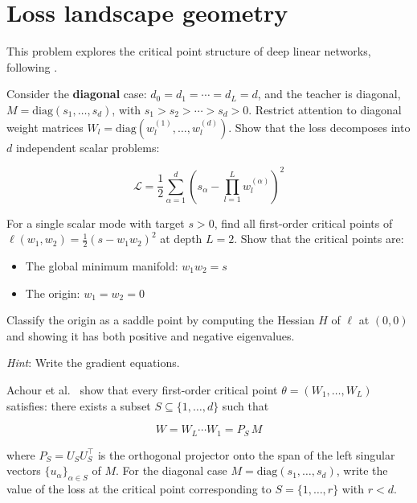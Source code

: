 \documentclass[11pt]{article}
\providecommand{\tightlist}{%
  \setlength{\itemsep}{0pt}\setlength{\parskip}{0pt}}
\begin{document}
\section{Loss landscape geometry}
\label{sec:td-geometry}

This problem explores the critical point structure of deep linear
networks, following \cite{achour2024}.

\begin{exercise}
\label{ex:td-1a}
Consider the \textbf{diagonal} case:
\(d_0 = d_1 = \cdots = d_L = d\), and the teacher is diagonal,
\(M = \text{diag}(s_1, \ldots, s_d)\), with
\(s_1 > s_2 > \cdots > s_d > 0\). Restrict attention to diagonal weight
matrices \(W_l = \text{diag}(w_l^{(1)}, \ldots, w_l^{(d)})\). Show that
the loss decomposes into \(d\) independent scalar problems:

\[\mathcal{L} = \frac{1}{2}\sum_{\alpha=1}^d \left(s_\alpha - \prod_{l=1}^L w_l^{(\alpha)}\right)^2\]
\end{exercise}


\begin{exercise}
\label{ex:td-1b}
For a single scalar mode with target \(s > 0\), find all
first-order critical points of
\(\ell(w_1, w_2) = \frac{1}{2}(s - w_1 w_2)^2\) at depth \(L = 2\). Show
that the critical points are:

\begin{itemize}
\tightlist
\item
  The global minimum manifold: \(w_1 w_2 = s\)
\item
  The origin: \(w_1 = w_2 = 0\)
\end{itemize}

Classify the origin as a saddle point by computing the Hessian \(H\) of
\(\ell\) at \((0,0)\) and showing it has both positive and negative
eigenvalues.

\emph{Hint}: Write the gradient equations.
\end{exercise}


\begin{exercise}
\label{ex:td-1c}
Achour et al.~\cite{achour2024} show that every
first-order critical point \(\theta = (W_1, \ldots, W_L)\) satisfies:
there exists a subset \(S \subseteq \{1, \ldots, d\}\) such that

\[W = W_L \cdots W_1 = P_S\, M\]

where \(P_S = U_S U_S^\top\) is the orthogonal projector onto the span
of the left singular vectors \(\{u_\alpha\}_{\alpha \in S}\) of \(M\).
For the diagonal case \(M = \text{diag}(s_1, \ldots, s_d)\), write the
value of the loss at the critical point corresponding to
\(S = \{1, \ldots, r\}\) with \(r < d\).
\end{exercise}
\end{document}
